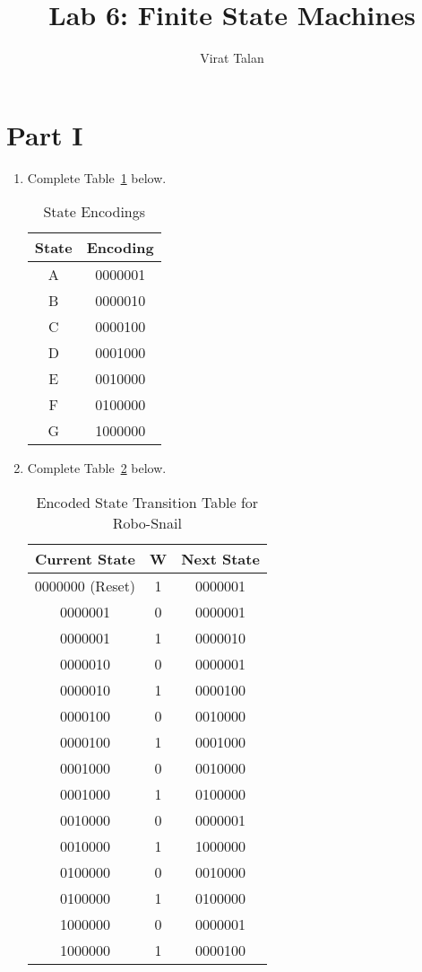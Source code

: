 \documentclass{article}
\title{Lab 6: Finite State Machines}
\author{Virat Talan}
\begin{document}
\maketitle

\section{Part I}

\begin{enumerate}

\item Complete Table~\ref{t:part1_state_encodings} below.

\begin{table}[ht!]
\caption{State Encodings}
\label{t:part1_state_encodings}
\centering
\begin{tabular}{|c|c|}
\hline
State & Encoding \\ \hline
A & 0000001 \\ \hline
B & 0000010 \\ \hline
C & 0000100 \\ \hline
D & 0001000 \\ \hline
E & 0010000 \\ \hline
F & 0100000 \\ \hline
G & 1000000 \\ \hline
\end{tabular}
\end{table}

\item Complete Table~\ref{t:part1_encoded_transition_table} below.

\begin{table}[ht!]
\caption{Encoded State Transition Table for Robo-Snail}
\label{t:part1_encoded_transition_table}
\centering
\begin{tabular}{|c|c|c|}
\hline
Current State & W & Next State \\ \hline
0000000 (Reset) & 1 & 0000001 \\ \hline
0000001 & 0 & 0000001 \\ \hline
0000001 & 1 & 0000010 \\ \hline
0000010 & 0 & 0000001 \\ \hline
0000010 & 1 & 0000100 \\ \hline
0000100 & 0 & 0010000 \\ \hline
0000100 & 1 & 0001000 \\ \hline
0001000 & 0 & 0010000 \\ \hline
0001000 & 1 & 0100000 \\ \hline
0010000 & 0 & 0000001 \\ \hline
0010000 & 1 & 1000000 \\ \hline
0100000 & 0 & 0010000 \\ \hline
0100000 & 1 & 0100000 \\ \hline
1000000 & 0 & 0000001 \\ \hline
1000000 & 1 & 0000100 \\ \hline
\end{tabular}
\end{table}


\end{enumerate}
\end{document}
